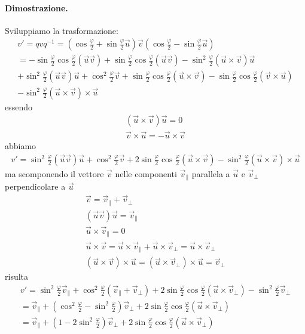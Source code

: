 \documentclass[a4paper,11pt]{article}
\begin{document}
\paragraph{Dimostrazione.}
Sviluppiamo la trasformazione:
\begin{eqnarray*}
	v' = q v q^{-1} = \left(\cos \frac{\varphi}{2} + \sin \frac{\varphi}{2} \vec u\right) \vec v \left(\cos \frac{\varphi}{2} - \sin \frac{\varphi}{2} \vec u\right)
\\
	= -\sin \frac{\varphi}{2} \cos \frac{\varphi}{2} (\vec u \vec v)
	+\sin \frac{\varphi}{2} \cos \frac{\varphi}{2} (\vec u \vec v)
	- \sin^2 \frac{\varphi}{2} (\vec u \times \vec v) \vec u
\\
	+ \sin^2 \frac{\varphi}{2} (\vec u \vec v) \vec u + \cos^2 \frac{\varphi}{2} \vec v
	+ \sin \frac{\varphi}{2} \cos \frac{\varphi}{2} (\vec u \times \vec v) 
	- \sin \frac{\varphi}{2} \cos \frac{\varphi}{2} (\vec v \times \vec u) 
\\
	- \sin^2  \frac{\varphi}{2} (\vec u \times \vec v) \times \vec u
\end{eqnarray*}
essendo
\begin{eqnarray*}
	(\vec u \times \vec v) \vec u = 0
\\
	\vec v \times \vec u = -\vec u \times \vec v
\end{eqnarray*}
abbiamo
\begin{eqnarray*}
	v' = 
	\sin^2 \frac{\varphi}{2} (\vec u \vec v) \vec u + \cos^2 \frac{\varphi}{2} \vec v
	+ 2 \sin \frac{\varphi}{2} \cos \frac{\varphi}{2} (\vec u \times \vec v) 
	- \sin^2  \frac{\varphi}{2} (\vec u \times \vec v) \times \vec u
\end{eqnarray*}
ma scomponendo il vettore $\vec v$ nelle componenti $\vec v_\parallel$ parallela a $\vec u$  e $\vec v_\perp$ perpendicolare a $\vec u$
\begin{eqnarray*}
	 \vec v = \vec v_\parallel +  \vec v_\perp 
\\
	(\vec u \vec v) \vec u = \vec v_\parallel
\\
	\vec u \times \vec v_\parallel = 0
\\
	\vec u \times \vec v = \vec u \times \vec v_\parallel + \vec u \times \vec v_\perp = \vec u \times \vec v_\perp
\\
	(\vec u \times \vec v) \times \vec u = (\vec u \times \vec v_\perp) \times \vec u = \vec v_\perp
\end{eqnarray*}
risulta
\begin{eqnarray*}
	v' = 
	\sin^2 \frac{\varphi}{2} \vec v_\parallel + \cos^2 \frac{\varphi}{2} (\vec v_\parallel + \vec v_\perp)
	+ 2 \sin \frac{\varphi}{2} \cos \frac{\varphi}{2} (\vec u \times \vec v_\perp) 
	- \sin^2  \frac{\varphi}{2} \vec v_\perp
\\
	= 
	\vec v_\parallel + \left(\cos^2 \frac{\varphi}{2} - \sin^2 \frac{\varphi}{2} \right) \vec v_\perp
	+ 2 \sin \frac{\varphi}{2} \cos \frac{\varphi}{2} (\vec u \times \vec v_\perp) 
\\
	= 
	\vec v_\parallel + \left(1 - 2 \sin^2 \frac{\varphi}{2} \right) \vec v_\perp
	+ 2 \sin \frac{\varphi}{2} \cos \frac{\varphi}{2} (\vec u \times \vec v_\perp) 
\end{eqnarray*}
\end{document}
